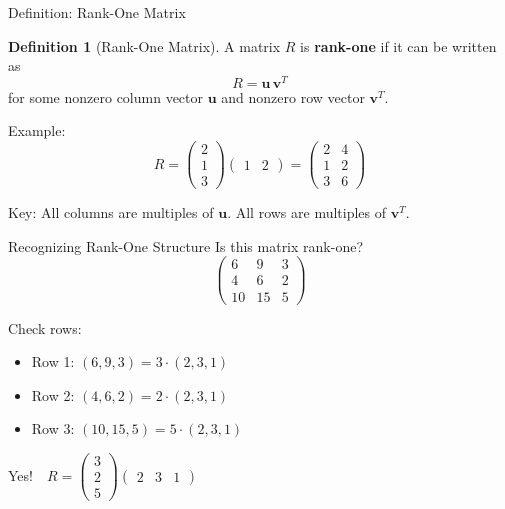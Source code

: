 \documentclass[10pt]{beamer}
\theoremstyle{definition}
\newtheorem{defi}{Definition}[section]
\newcommand{\x}[1]{\alert{\textbf{#1}}}
\begin{document}
\begin{frame}{Definition: Rank-One Matrix}
\begin{defi}[Rank-One Matrix]
A matrix $R$ is \x{rank-one} if it can be written as
$$R = \mathbf{u}\, \mathbf{v}^T$$
for some nonzero column vector $\mathbf{u}$ and nonzero row vector $\mathbf{v}^T$.
\end{defi}

\vspace{0.3cm}
Example:
$$R = \begin{pmatrix} 2 \\ 1 \\ 3 \end{pmatrix} \begin{pmatrix} 1 & 2 \end{pmatrix}
= \begin{pmatrix}
2 & 4 \\
1 & 2 \\
3 & 6
\end{pmatrix}$$

\vspace{0.2cm}
Key: All columns are multiples of $\mathbf{u}$. All rows are multiples of $\mathbf{v}^T$.
\end{frame}

\begin{frame}{Recognizing Rank-One Structure}
Is this matrix rank-one?
$$\begin{pmatrix}
6 & 9 & 3 \\
4 & 6 & 2 \\
10 & 15 & 5
\end{pmatrix}$$

\vfill
Check rows:
\begin{itemize}
\item Row 1: $(6, 9, 3) = 3 \cdot (2, 3, 1)$
\item Row 2: $(4, 6, 2) = 2 \cdot (2, 3, 1)$
\item Row 3: $(10, 15, 5) = 5 \cdot (2, 3, 1)$
\end{itemize}

\vfill
Yes!\ \ $R = \begin{pmatrix} 3 \\ 2 \\ 5 \end{pmatrix} \begin{pmatrix} 2 & 3 & 1 \end{pmatrix}$
\end{frame}
\end{document}
